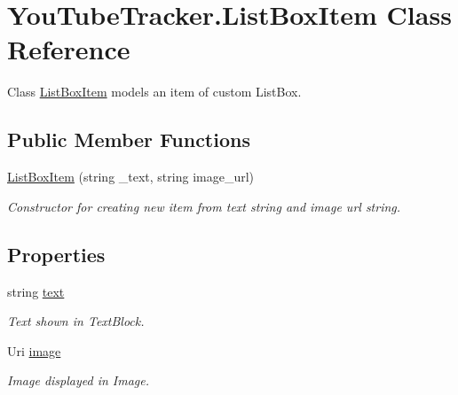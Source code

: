 \hypertarget{class_you_tube_tracker_1_1_list_box_item}{}\section{You\+Tube\+Tracker.\+List\+Box\+Item Class Reference}
\label{class_you_tube_tracker_1_1_list_box_item}


Class {\ttfamily \mbox{\hyperlink{class_you_tube_tracker_1_1_list_box_item}{List\+Box\+Item}}} models an item of custom List\+Box.  


\subsection*{Public Member Functions}
\begin{DoxyCompactItemize}
\item 
\mbox{\hyperlink{class_you_tube_tracker_1_1_list_box_item_a4e0b02f68b5fa2dcb2e9181897f72495}{List\+Box\+Item}} (string \+\_\+text, string image\+\_\+url)
\begin{DoxyCompactList}\small\item\em Constructor for creating new item from text string and image url string. \end{DoxyCompactList}\end{DoxyCompactItemize}
\subsection*{Properties}
\begin{DoxyCompactItemize}
\item 
string \mbox{\hyperlink{class_you_tube_tracker_1_1_list_box_item_a39c781719df70576a81d8c16a524f946}{text}}
\begin{DoxyCompactList}\small\item\em Text shown in Text\+Block. \end{DoxyCompactList}\item 
Uri \mbox{\hyperlink{class_you_tube_tracker_1_1_list_box_item_acb47893bd730bdc88d79198bbfd0b9bb}{image}}
\begin{DoxyCompactList}\small\item\em Image displayed in Image. \end{DoxyCompactList}\end{DoxyCompactItemize}


